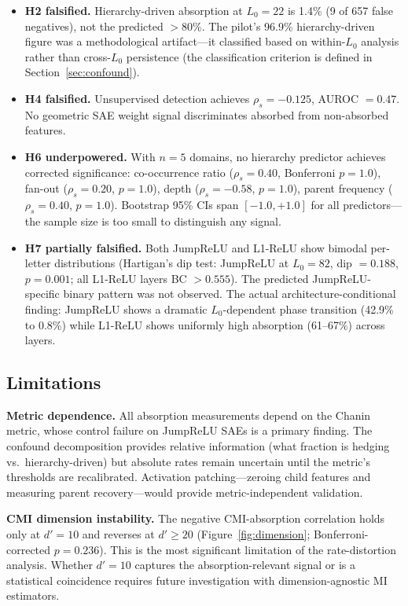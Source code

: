 \documentclass{article}
\begin{document}
\begin{itemize}
\item \textbf{H2 falsified.} Hierarchy-driven absorption at $L_0{=}22$ is 1.4\% (9 of 657 false negatives), not the predicted $> 80\%$. The pilot's 96.9\% hierarchy-driven figure was a methodological artifact---it classified based on within-$L_0$ analysis rather than cross-$L_0$ persistence (the classification criterion is defined in Section~\ref{sec:confound}).

\item \textbf{H4 falsified.} Unsupervised detection achieves $\rho_s = -0.125$, AUROC $= 0.47$. No geometric SAE weight signal discriminates absorbed from non-absorbed features.

\item \textbf{H6 underpowered.} With $n = 5$ domains, no hierarchy predictor achieves corrected significance: co-occurrence ratio ($\rho_s = 0.40$, Bonferroni $p = 1.0$), fan-out ($\rho_s = 0.20$, $p = 1.0$), depth ($\rho_s = -0.58$, $p = 1.0$), parent frequency ($\rho_s = 0.40$, $p = 1.0$). Bootstrap 95\% CIs span $[-1.0, +1.0]$ for all predictors---the sample size is too small to distinguish any signal.

\item \textbf{H7 partially falsified.} Both JumpReLU and L1-ReLU show bimodal per-letter distributions (Hartigan's dip test: JumpReLU at $L_0{=}82$, dip $= 0.188$, $p = 0.001$; all L1-ReLU layers BC $> 0.555$). The predicted JumpReLU-specific binary pattern was not observed. The actual architecture-conditional finding: JumpReLU shows a dramatic $L_0$-dependent phase transition (42.9\% to 0.8\%) while L1-ReLU shows uniformly high absorption (61--67\%) across layers.
\end{itemize}

\subsection{Limitations}

\textbf{Metric dependence.} All absorption measurements depend on the Chanin metric, whose control failure on JumpReLU SAEs is a primary finding. The confound decomposition provides relative information (what fraction is hedging vs.\ hierarchy-driven) but absolute rates remain uncertain until the metric's thresholds are recalibrated. Activation patching---zeroing child features and measuring parent recovery---would provide metric-independent validation.

\textbf{CMI dimension instability.} The negative CMI-absorption correlation holds only at $d' = 10$ and reverses at $d' \geq 20$ (Figure~\ref{fig:dimension}; Bonferroni-corrected $p = 0.236$). This is the most significant limitation of the rate-distortion analysis. Whether $d' = 10$ captures the absorption-relevant signal or is a statistical coincidence requires future investigation with dimension-agnostic MI estimators.
\end{document}
